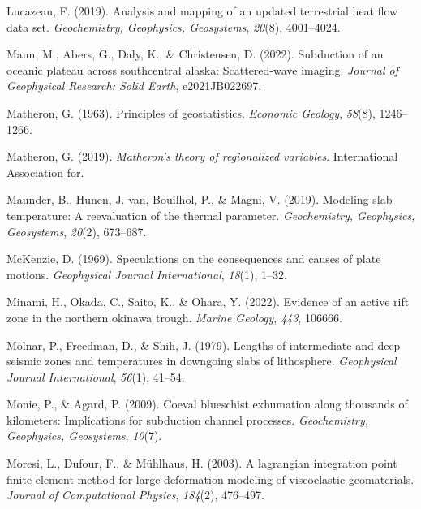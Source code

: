 \begin{CSLReferences}{1}{1}
\leavevmode{}%
Lucazeau, F. (2019). Analysis and mapping of an updated terrestrial heat flow data set. \emph{Geochemistry, Geophysics, Geosystems}, \emph{20}(8), 4001--4024.

\leavevmode{}%
Mann, M., Abers, G., Daly, K., \& Christensen, D. (2022). Subduction of an oceanic plateau across southcentral alaska: Scattered-wave imaging. \emph{Journal of Geophysical Research: Solid Earth}, e2021JB022697.

\leavevmode{}%
Matheron, G. (1963). Principles of geostatistics. \emph{Economic Geology}, \emph{58}(8), 1246--1266.

\leavevmode{}%
Matheron, G. (2019). \emph{Matheron's theory of regionalized variables}. International Association for.

\leavevmode{}%
Maunder, B., Hunen, J. van, Bouilhol, P., \& Magni, V. (2019). Modeling slab temperature: A reevaluation of the thermal parameter. \emph{Geochemistry, Geophysics, Geosystems}, \emph{20}(2), 673--687.

\leavevmode{}%
McKenzie, D. (1969). Speculations on the consequences and causes of plate motions. \emph{Geophysical Journal International}, \emph{18}(1), 1--32.

\leavevmode{}%
Minami, H., Okada, C., Saito, K., \& Ohara, Y. (2022). Evidence of an active rift zone in the northern okinawa trough. \emph{Marine Geology}, \emph{443}, 106666.

\leavevmode{}%
Molnar, P., Freedman, D., \& Shih, J. (1979). Lengths of intermediate and deep seismic zones and temperatures in downgoing slabs of lithosphere. \emph{Geophysical Journal International}, \emph{56}(1), 41--54.

\leavevmode{}%
Monie, P., \& Agard, P. (2009). Coeval blueschist exhumation along thousands of kilometers: Implications for subduction channel processes. \emph{Geochemistry, Geophysics, Geosystems}, \emph{10}(7).

\leavevmode{}%
Moresi, L., Dufour, F., \& Mühlhaus, H. (2003). A lagrangian integration point finite element method for large deformation modeling of viscoelastic geomaterials. \emph{Journal of Computational Physics}, \emph{184}(2), 476--497.


\end{CSLReferences}
